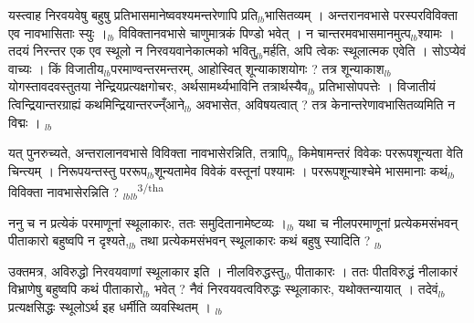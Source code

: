 \documentclass[article,12pt,a4paper]{memoir}%
\newcounter{parCount}
\begin{document}
	  
	  \pstart \leavevmode%
	यस्त्वाह निरवयवेषु बहुषु प्रतिभासमानेष्ववश्यमन्तरेणापि प्रति{\tiny $_{lb}$}भासितव्यम् । अन्तरानवभासे परस्परविविक्ता एव नावभासिताः स्युः ।{\tiny $_{lb}$} विविक्तानवभासे चाणुमात्रकं पिण्डो भवेत् । न चान्तरमवभासमानमुत्प{\tiny $_{lb}$}श्यामः । तदयं निरन्तर एक एव स्थूलो न निरवयवानेकात्मको भवितु{\tiny $_{lb}$}मर्हति, अपि त्वेकः स्थूलात्मक एवेति । सोऽप्येवं वाच्यः । किं विजातीय{\tiny $_{lb}$}परमाण्वन्तरमन्तरम्, आहोस्वित् शून्याकाशयोगः ? तत्र शून्याकाश{\tiny $_{lb}$}योगस्तावदवस्तुतया नेन्द्रियप्रत्यक्षगोचरः, अर्थसामर्थ्यभाविनि तत्रार्थस्यैव{\tiny $_{lb}$} प्रतिभासोपपत्तेः । विजातीयं त्विन्द्रियान्तरग्राह्यं कथमिन्द्रियान्तरज्न्ँआने{\tiny $_{lb}$} अवभासेत, अविषयत्वात् ? तत्र केनान्तरेणावभासितव्यमिति न विद्मः ।
	{}
	\pend%
      {\tiny $_{lb}$}

	  
	  \pstart \leavevmode%
	यत् पुनरुच्यते, अन्तरालानवभासे विविक्ता नावभासेरन्निति, तत्रापि{\tiny $_{lb}$} किमेषामन्तरं विवेकः पररूपशून्यता वेति चिन्त्यम् । निरूपयन्तस्तु पररूप{\tiny $_{lb}$}शून्यतामेव विवेकं वस्तूनां पश्यामः । पररूपशून्याश्चेमे भासमानाः कथं{\tiny $_{lb}$} विविक्ता नावभासेरन्निति ?
	{}
	\pend%
      {\tiny $_{lb}$}{\tiny $_{lb}$}\textsuperscript{\textenglish{3/tha}}

	  
	  \pstart \leavevmode%
	ननु च न प्रत्येकं परमाणूनां स्थूलाकारः, ततः समुदितानामेष्टव्यः ।{\tiny $_{lb}$} यथा च नीलपरमाणूनां प्रत्येकमसंभवन् पीताकारो बहुष्वपि न दृश्यते,{\tiny $_{lb}$} तथा प्रत्येकमसंभवन् स्थूलाकारः कथं बहुषु स्यादिति ?
	{}
	\pend%
      {\tiny $_{lb}$}

	  
	  \pstart \leavevmode%
	उक्तमत्र, अविरुद्धो निरवयवाणां स्थूलाकार इति । नीलविरुद्धस्तु{\tiny $_{lb}$} पीताकारः । ततः पीतविरुद्धं नीलाकारं विभ्राणेषु बहुष्वपि कथं पीताकारो{\tiny $_{lb}$} भवेत् ? नैवं निरवयवत्वविरुद्धः स्थूलाकारः, यथोक्तन्यायात् । तदेवं{\tiny $_{lb}$} प्रत्यक्षसिद्धः स्थूलोऽर्थ इह धर्मीति व्यवस्थितम् ।
	{}
	\pend%
      {\tiny $_{lb}$}
\end{document}
